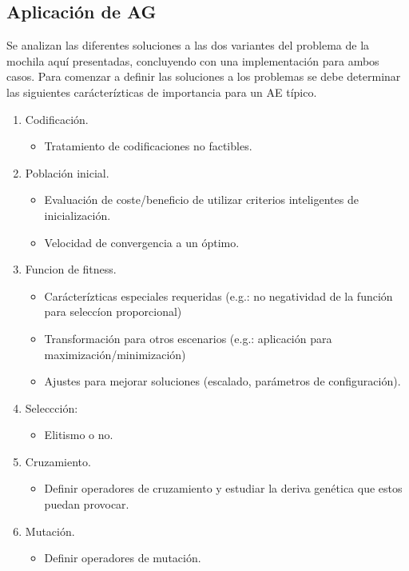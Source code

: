 \documentclass[9pt,conference]{IEEEtran}
\begin{document}
	\subsection{Aplicaci\'on de AG}

	Se analizan las diferentes soluciones a las dos variantes del problema de la mochila aqu\'i presentadas, concluyendo con una implementaci\'on para ambos casos.
	Para comenzar a definir las soluciones a los problemas se debe determinar las siguientes car\'acter\'izticas de importancia para un AE t\'ipico.

	\begin{enumerate}
		\item Codificaci\'on.
		\begin{itemize}
				\item Tratamiento de codificaciones no factibles.
		\end{itemize}
		\item Poblaci\'on inicial.
		\begin{itemize}
				\item  Evaluaci\'on de coste/beneficio de utilizar criterios inteligentes de inicializaci\'on.
				\item  Velocidad de convergencia a un \'optimo.
		\end{itemize}
		\item Funcion de fitness.
		\begin{itemize}
				\item  Car\'acter\'izticas especiales requeridas (e.g.: no negatividad de la funci\'on para selecc\'ion proporcional)
				\item  Transformaci\'on para otros escenarios (e.g.: aplicaci\'on para maximizaci\'on/minimizaci\'on)
				\item  Ajustes para mejorar soluciones (escalado, par\'ametros de configuraci\'on).
		\end{itemize}
		\item Seleccci\'on:
		\begin{itemize}
				\item  Elitismo o no.
		\end{itemize}
		\item Cruzamiento.
		\begin{itemize}
			\item Definir operadores de cruzamiento y estudiar la deriva gen\'etica que estos puedan provocar. 
		\end{itemize}
		\item Mutaci\'on.
		\begin{itemize}
			\item Definir operadores de mutaci\'on. 
		\end{itemize}
	\end{enumerate}
\end{document}
